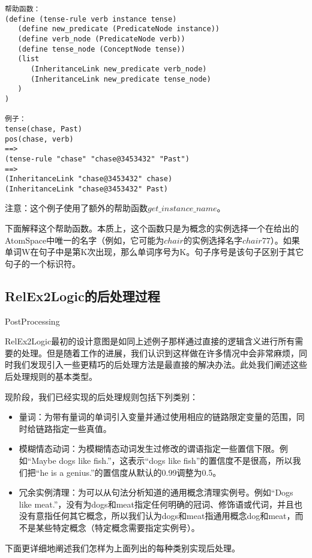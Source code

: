 \begin{verbatim}
帮助函数：
(define (tense-rule verb instance tense)
   (define new_predicate (PredicateNode instance))
   (define verb_node (PredicateNode verb)) 
   (define tense_node (ConceptNode tense))
   (list
      (InheritanceLink new_predicate verb_node)
      (InheritanceLink new_predicate tense_node)
   )
)

例子：
tense(chase, Past)
pos(chase, verb)
==>
(tense-rule "chase" "chase@3453432" "Past")
==>
(InheritanceLink "chase@3453432" chase)
(InheritanceLink "chase@3453432" Past)

\end{verbatim}

注意：这个例子使用了额外的帮助函数$get\_instance\_name$。

下面解释这个帮助函数。本质上，这个函数只是为概念的实例选择一个在给出的AtomSpace中唯一的名字（例如，它可能为$chair$的实例选择名字$chair77$）。如果单词W在句子中是第K次出现，那么单词序号为K。句子序号是该句子区别于其它句子的一个标识符。

\subsection{RelEx2Logic的后处理过程}{PostProcessing}

RelEx2Logic最初的设计意图是如同上述例子那样通过直接的逻辑含义进行所有需要的处理。但是随着工作的进展，我们认识到这样做在许多情况中会非常麻烦，同时我们发现引入一些更精巧的后处理方法是最直接的解决办法。此处我们阐述这些后处理规则的基本类型。

现阶段，我们已经实现的后处理规则包括下列类别：

\begin{itemize}
\item 量词：为带有量词的单词引入变量并通过使用相应的链路限定变量的范围，同时给链路指定一些真值。
\item 模糊情态动词：为模糊情态动词发生过修改的谓语指定一些置信下限。例如“Maybe dogs like fish.”，这表示“dogs like fish”的置信度不是很高，所以我们把“he is a genius.”的置信度从默认的0.99调整为0.5。
\item 冗余实例清理：为可以从句法分析知道的通用概念清理实例号。例如“Dogs like meat.”，没有为dogs和meat指定任何明确的冠词、修饰语或代词，并且也没有意指任何其它概念，所以我们认为dogs和meat指通用概念dog和meat，而不是某些特定概念（特定概念需要指定实例号）。
\end{itemize}

下面更详细地阐述我们怎样为上面列出的每种类别实现后处理。

